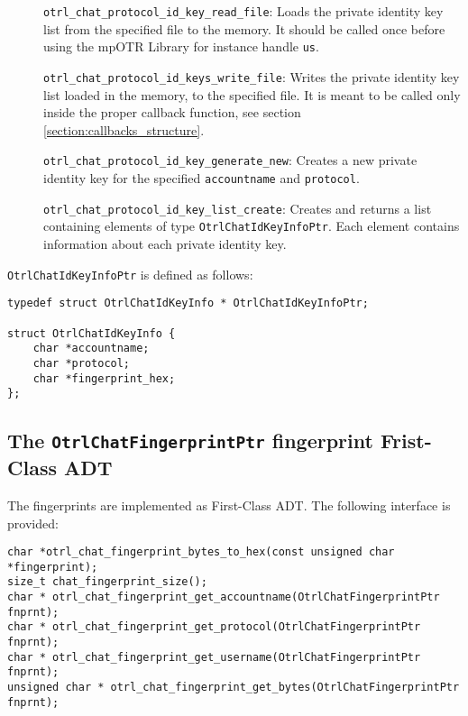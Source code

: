 \begin{description}
  \item[] \texttt{otrl\_chat\_protocol\_id\_key\_read\_file}: Loads the private identity key list from the specified file to the memory. It should be called once before using the mpOTR Library for instance handle \texttt{us}.
  
  \item[] \texttt{otrl\_chat\_protocol\_id\_keys\_write\_file}: Writes the private identity key list loaded in the memory, to the specified file. It is meant to be called only inside the proper callback function, see section \ref{section:callbacks_structure}.
  
  \item[] \texttt{otrl\_chat\_protocol\_id\_key\_generate\_new}: Creates a new private identity key for the specified \texttt{accountname} and \texttt{protocol}.
  
  \item[] \texttt{otrl\_chat\_protocol\_id\_key\_list\_create}: Creates and returns a list containing elements of type \texttt{OtrlChatIdKeyInfoPtr}. Each element contains information about each private identity key.

\end{description}

\texttt{OtrlChatIdKeyInfoPtr} is defined as follows:
\begin{lstlisting}
typedef struct OtrlChatIdKeyInfo * OtrlChatIdKeyInfoPtr;

struct OtrlChatIdKeyInfo {
	char *accountname;
	char *protocol;
	char *fingerprint_hex;
};
\end{lstlisting}

\subsection{The \texttt{OtrlChatFingerprintPtr} fingerprint Frist-Class ADT}
The fingerprints are implemented as First-Class ADT. The following interface is provided:

\begin{lstlisting}
char *otrl_chat_fingerprint_bytes_to_hex(const unsigned char *fingerprint);
size_t chat_fingerprint_size();
char * otrl_chat_fingerprint_get_accountname(OtrlChatFingerprintPtr fnprnt);
char * otrl_chat_fingerprint_get_protocol(OtrlChatFingerprintPtr fnprnt);
char * otrl_chat_fingerprint_get_username(OtrlChatFingerprintPtr fnprnt);
unsigned char * otrl_chat_fingerprint_get_bytes(OtrlChatFingerprintPtr fnprnt);
\end{lstlisting}

